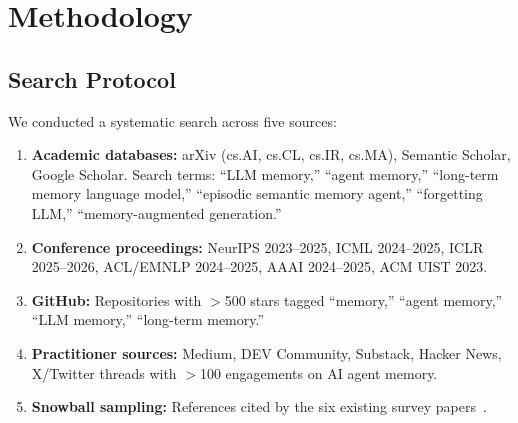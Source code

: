 \section{Methodology}
\label{sec:methodology}


\subsection{Search Protocol}

We conducted a systematic search across five sources:

\begin{enumerate}[leftmargin=*, nosep]
    \item \textbf{Academic databases:} arXiv (cs.AI, cs.CL, cs.IR,
    cs.MA), Semantic Scholar, Google Scholar. Search terms:
    ``LLM memory,'' ``agent memory,'' ``long-term memory language
    model,'' ``episodic semantic memory agent,'' ``forgetting LLM,''
    ``memory-augmented generation.''
    \item \textbf{Conference proceedings:} NeurIPS 2023--2025, ICML
    2024--2025, ICLR 2025--2026, ACL/EMNLP 2024--2025, AAAI 2024--2025,
    ACM UIST 2023.
    \item \textbf{GitHub:} Repositories with $>$500 stars tagged
    ``memory,'' ``agent memory,'' ``LLM memory,'' ``long-term memory.''
    \item \textbf{Practitioner sources:} Medium, DEV Community, Substack,
    Hacker News, X/Twitter threads with $>$100 engagements on AI
    agent memory.
    \item \textbf{Snowball sampling:} References cited by the six
    existing survey papers~\cite{sumers2024coala, gao2023rag,
    zhang2024survey, hu2025memory, wu2025memory, du2025memory}.
\end{enumerate}

